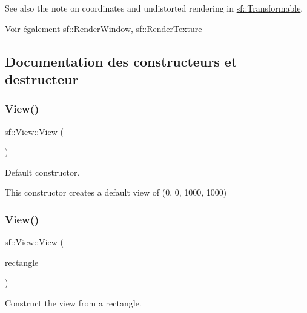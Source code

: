 See also the note on coordinates and undistorted rendering in \hyperlink{classsf_1_1Transformable}{sf\+::\+Transformable}.

\begin{DoxySeeAlso}{Voir également}
\hyperlink{classsf_1_1RenderWindow}{sf\+::\+Render\+Window}, \hyperlink{classsf_1_1RenderTexture}{sf\+::\+Render\+Texture} 
\end{DoxySeeAlso}


\subsection{Documentation des constructeurs et destructeur}
\mbox{\label{classsf_1_1View_a28c38308ff089ae5bdacd001d12286d3}} 
\subsubsection{\texorpdfstring{View()}{View()}\hspace{0.1cm}{\footnotesize\ttfamily [1/3]}}
{\footnotesize\ttfamily sf\+::\+View\+::\+View (\begin{DoxyParamCaption}{ }\end{DoxyParamCaption})}



Default constructor. 

This constructor creates a default view of (0, 0, 1000, 1000) \mbox{\label{classsf_1_1View_a1d63bc49e041b3b1ff992bb6430e1326}} 
\subsubsection{\texorpdfstring{View()}{View()}\hspace{0.1cm}{\footnotesize\ttfamily [2/3]}}
{\footnotesize\ttfamily sf\+::\+View\+::\+View (\begin{DoxyParamCaption}\item[{const \hyperlink{classsf_1_1Rect}{Float\+Rect} \&}]{rectangle }\end{DoxyParamCaption})\hspace{0.3cm}{\ttfamily [explicit]}}



Construct the view from a rectangle. 


